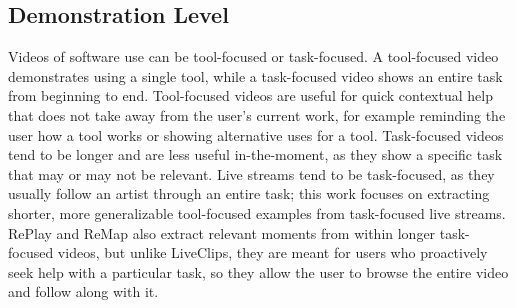 \subsection{Demonstration Level}
Videos of software use can be tool-focused or task-focused. A tool-focused video demonstrates using a single tool, while a task-focused video shows an entire task from beginning to end.  Tool-focused videos are useful for quick contextual help that does not take away from the user's current work, for example reminding the user how a tool works \cite{Grossman2010a} or showing alternative uses for a tool.
Task-focused videos tend to be longer and are less useful in-the-moment, as they show a specific task that may or may not be relevant. Live streams tend to be task-focused, as they usually follow an artist through an entire task; this work focuses on extracting shorter, more generalizable tool-focused examples from task-focused live streams. RePlay and ReMap also extract relevant moments from within longer task-focused videos, but unlike LiveClips, they are meant for users who proactively seek help with a particular task, so they allow the user to browse the entire video and follow along with it.




